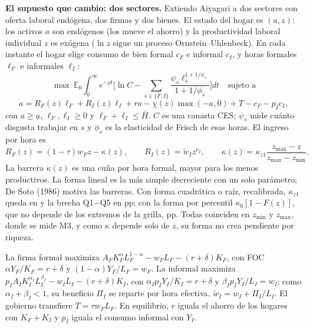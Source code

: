 \documentclass[11pt]{article}
\begin{document}
\textbf{El supuesto que cambio: dos sectores.} Extiendo Aiyagari a dos sectores con oferta laboral endógena, dos firmas y dos bienes. El estado del hogar es $(a,z)$: los activos $a$ son endógenos
(los mueve el ahorro) y la productividad laboral individual $z$ es exógena ($\ln z$ sigue un proceso Ornstein--Uhlenbeck).
En cada instante el hogar elige consumo de bien formal $c_F$ e informal $c_I$, y horas formales $\ell_F$ e informales $\ell_I$:
\[
\max\ \mathbb E_0\!\int_0^\infty e^{-\rho t}\Big[\ln C-\sum_{s\in\{F,I\}}\frac{\psi_s\ell_s^{1+1/\phi_s}}{1+1/\phi_s}\Big]dt
\quad\text{sujeto a}
\]
\[
\dot a=R_F(z)\ell_F+R_I(z)\ell_I+ra-\chi(z)\max(-a,0)+T-c_F-p_Ic_I,
\]
con $a\ge\underline a$, $\ell_F,\ell_I\ge0$ y $\ell_F+\ell_I\le\bar H$. $C$ es una canasta CES; $\psi_s$ mide cuánto disgusta trabajar en $s$
y $\phi_s$ es la elasticidad de Frisch de esas horas. El ingreso por hora es
\[
R_F(z)=(1-\tau)w_Fz-\kappa(z),\qquad R_I(z)=\widetilde w_Iz^{\nu_I},\qquad
\kappa(z)=\kappa_{z1}\frac{z_{\max}-z}{z_{\max}-z_{\min}} .
\]
La barrera $\kappa(z)$ es una cuña por hora formal, mayor para los menos productivos. La forma lineal es la más simple decreciente
con un solo parámetro; De Soto (1986) motiva las barreras. Con forma cuadrática o raíz, recalibrada,
$\kappa_{z1}$ queda en \KappaRangeShapes{} y la brecha Q1$-$Q5 en \VThreeKappaRangeBase{} pp; con la forma por percentil $\kappa_0[1-F(z)]$,
que no depende de los extremos de la grilla, \VThreePctBasePP{} pp. Todas coinciden en $z_{\min}$ y $z_{\max}$, donde se mide M3, y como $\kappa$
depende solo de $z$, su forma no crea pendiente por riqueza.

La firma formal maximiza $A_FK_F^{\alpha}L_F^{1-\alpha}-w_FL_F-(r+\delta)K_F$, con FOC $\alpha Y_F/K_F=r+\delta$ y $(1-\alpha)Y_F/L_F=w_F$.
La informal maximiza $p_IA_IK_I^{\alpha_I}L_I^{\beta_I}-w_IL_I-(r+\delta)K_I$, con $\alpha_I p_IY_I/K_I=r+\delta$ y $\beta_Ip_IY_I/L_I=w_I$;
como $\alpha_I+\beta_I<1$, su beneficio $\Pi_I$ se reparte por hora efectiva, $\widetilde w_I=w_I+\Pi_I/L_I$. El gobierno transfiere
$T=\tau w_FL_F$. En equilibrio, $r$ iguala el ahorro de los hogares con $K_F+K_I$ y $p_I$ iguala el consumo informal con $Y_I$.
\end{document}
